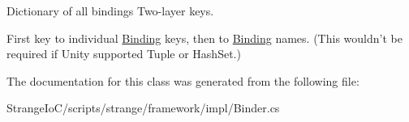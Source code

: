 Dictionary of all bindings Two-\/layer keys. 

First key to individual \hyperlink{classstrange_1_1framework_1_1impl_1_1_binding}{Binding} keys, then to \hyperlink{classstrange_1_1framework_1_1impl_1_1_binding}{Binding} names. (This wouldn't be required if Unity supported Tuple or Hash\-Set.) 

The documentation for this class was generated from the following file\-:\begin{DoxyCompactItemize}
\item 
Strange\-Io\-C/scripts/strange/framework/impl/Binder.\-cs\end{DoxyCompactItemize}
